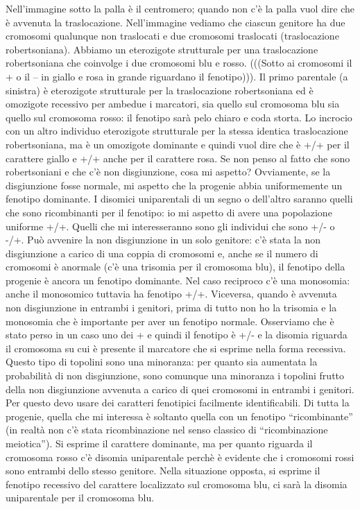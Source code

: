 \documentclass[11pt]{book}
\begin{document}
Nell’immagine sotto la palla è il centromero; quando non c’è la palla vuol dire che è avvenuta la traslocazione. Nell’immagine vediamo che ciascun genitore ha due cromosomi qualunque non traslocati e due cromosomi traslocati (traslocazione robertsoniana). Abbiamo un eterozigote strutturale per una traslocazione robertsoniana che coinvolge i due cromosomi blu e rosso.
(((Sotto ai cromosomi il + o il – in giallo e rosa in grande riguardano il fenotipo))).
Il primo parentale (a sinistra) è eterozigote strutturale per la traslocazione robertsoniana ed è omozigote recessivo per ambedue i marcatori, sia quello sul cromosoma blu sia quello sul cromosoma rosso: il fenotipo sarà pelo chiaro e coda storta.
Lo incrocio con un altro individuo eterozigote strutturale per la stessa identica traslocazione robertsoniana, ma è un omozigote dominante e quindi vuol dire che è +/+ per il carattere giallo e +/+ anche per il carattere rosa.
Se non penso al fatto che sono robertsoniani e che c’è non disgiunzione, cosa mi aspetto? Ovviamente, se la disgiunzione fosse normale,  mi aspetto che la progenie abbia uniformemente un fenotipo dominante.
I disomici uniparentali di un segno o dell’altro saranno quelli che sono ricombinanti per il fenotipo: io mi aspetto di avere una popolazione uniforme +/+. Quelli che mi interesseranno sono gli individui che sono +/- o -/+.
Può avvenire la non disgiunzione in un solo genitore: c’è stata la non disgiunzione a carico di una coppia di cromosomi e, anche se il numero di cromosomi è anormale (c’è una trisomia per il cromosoma blu), il fenotipo della progenie è ancora un fenotipo dominante. 
Nel caso reciproco c’è una monosomia: anche il monosomico tuttavia ha fenotipo +/+.
Viceversa, quando è avvenuta non disgiunzione in entrambi i genitori, prima di tutto non ho la trisomia e la monosomia che è importante per aver un fenotipo normale. Osserviamo che è stato perso in un caso uno dei + e quindi il fenotipo è +/- e la disomia riguarda il cromosoma su cui è presente il marcatore che si esprime nella forma recessiva. Questo tipo di topolini sono una minoranza: per quanto sia aumentata la probabilità di non disgiunzione, sono comunque una minoranza i topolini frutto della non disgiunzione avvenuta a carico di quei cromosomi in entrambi i genitori. Per questo devo usare dei caratteri fenotipici facilmente identificabili.
Di tutta la progenie, quella che mi interessa è soltanto quella con un fenotipo “ricombinante” (in realtà non c’è stata ricombinazione nel senso classico di “ricombinazione meiotica”). Si esprime il carattere dominante, ma per quanto riguarda il cromosoma rosso c’è disomia uniparentale perchè è evidente che i cromosomi rossi sono entrambi dello stesso genitore. Nella situazione opposta, si esprime il fenotipo recessivo del carattere localizzato sul cromosoma blu, ci sarà la disomia uniparentale per il cromosoma blu. 
\end{document}
